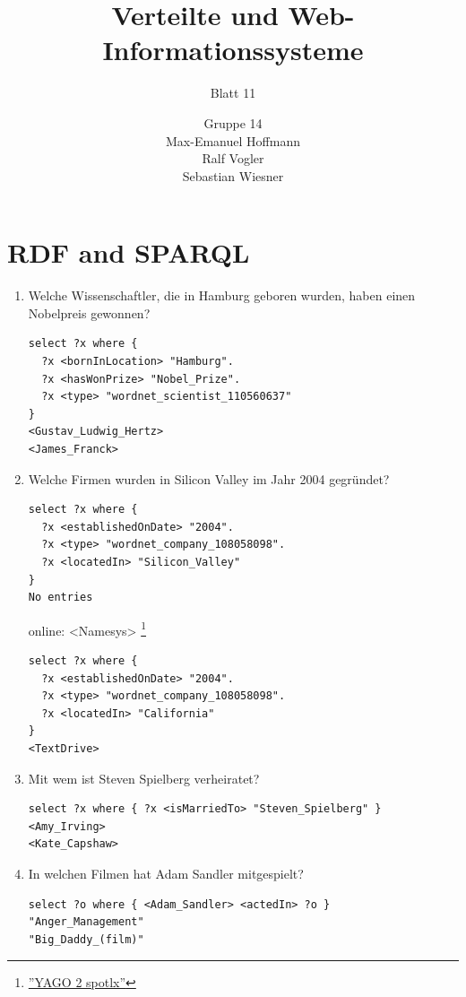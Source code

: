 \documentclass[11pt,a4paper]{scrartcl}
\begin{document}
\author{Gruppe 14\\Max-Emanuel Hoffmann\\Ralf Vogler\\Sebastian Wiesner}
\title{Verteilte und Web-Informationssysteme}
\subtitle{Blatt 11}

\maketitle

\section{RDF and SPARQL}

\begin{enumerate}

\item[1)] Welche Wissenschaftler, die in Hamburg geboren wurden, haben einen Nobelpreis gewonnen?\\
\begin{verbatim}
select ?x where {
  ?x <bornInLocation> "Hamburg".
  ?x <hasWonPrize> "Nobel_Prize".
  ?x <type> "wordnet_scientist_110560637"
}
<Gustav_Ludwig_Hertz>
<James_Franck>
\end{verbatim}


\item[2)] Welche Firmen wurden in Silicon Valley im Jahr 2004 gegründet?\\
\begin{verbatim}
select ?x where {
  ?x <establishedOnDate> "2004".
  ?x <type> "wordnet_company_108058098".
  ?x <locatedIn> "Silicon_Valley"
}
No entries
\end{verbatim}
online: <Namesys> \footnote{\href{''https://d5gate.ag5.mpi-sb.mpg.de/webyagospotlx/WebInterface?passedQuery=I%
''}{''YAGO 2 spotlx''}}
\begin{verbatim}
select ?x where {
  ?x <establishedOnDate> "2004".
  ?x <type> "wordnet_company_108058098".
  ?x <locatedIn> "California"
}
<TextDrive>
\end{verbatim}


\item[3)] Mit wem ist Steven Spielberg verheiratet?\\
\begin{verbatim}
select ?x where { ?x <isMarriedTo> "Steven_Spielberg" }
<Amy_Irving>
<Kate_Capshaw>
\end{verbatim}


\item[4)] In welchen Filmen hat Adam Sandler mitgespielt?\\
\begin{verbatim}
select ?o where { <Adam_Sandler> <actedIn> ?o }
"Anger_Management"
"Big_Daddy_(film)"
\end{verbatim}

\end{enumerate}
\end{document}
